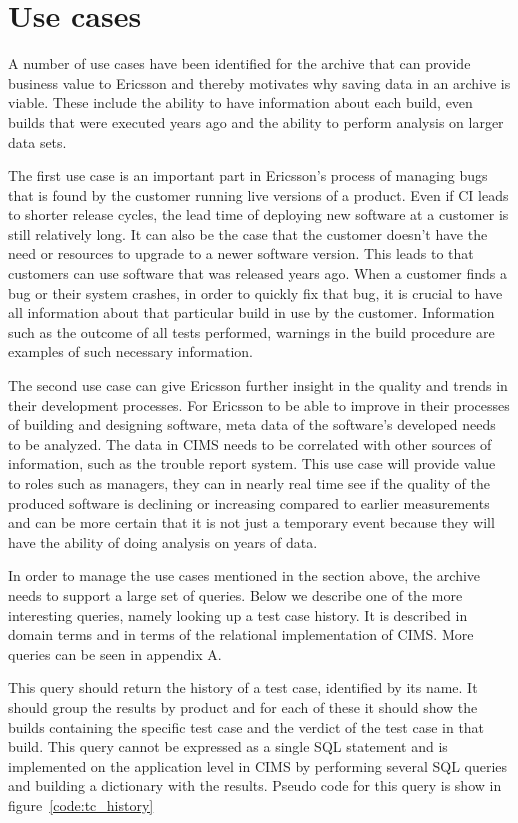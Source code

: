\section{Use cases}
\label{sec:usecases}
A number of use cases have been identified for the archive that can provide business value to Ericsson and thereby motivates why saving data in an archive is viable. These include the ability to have information about each build, even builds that were executed years ago and the ability to perform analysis on larger data sets. 

The first use case is an important part in Ericsson's process of managing bugs that is found by the customer running live versions of a product. Even if CI leads to shorter release cycles, the lead time of deploying new software at a customer is still relatively long. It can also be the case that the customer doesn't have the need or resources to upgrade to a newer software version. This leads to that customers can use software that was released years ago. When a customer finds a bug or their system crashes, in order to quickly fix that bug, it is crucial to have all information about that particular build in use by the customer. Information such as the outcome of all tests performed, warnings in the build procedure are examples of such necessary information. 

The second use case can give Ericsson further insight in the quality and trends in their development processes. For Ericsson to be able to improve in their processes of building and designing software, meta data of the software's developed needs to be analyzed. The data in CIMS needs to be correlated with other sources of information, such as the trouble report system. This use case will provide value to roles such as managers, they can in nearly real time see if the quality of the produced software is declining or increasing compared to earlier measurements and can be more certain that it is not just a temporary event because they will have the ability of doing analysis on years of data. 


In order to manage the use cases mentioned in the section above, the archive needs to support a large set of queries. Below we describe one of the more interesting queries, namely looking up a test case history. It is described in domain terms and in terms of the relational implementation of CIMS. More queries can be seen in appendix A.


\label{q:tchistory}
This query should return the history of a test case, identified by its name. It should group the results by product and for each of these it should show the builds containing the specific test case and the verdict of the test case in that build. This query cannot be expressed as a single SQL statement and is implemented on the application level in CIMS by performing several SQL queries and building a dictionary with the results. Pseudo code for this query is show in figure~\ref{code:tc_history}

